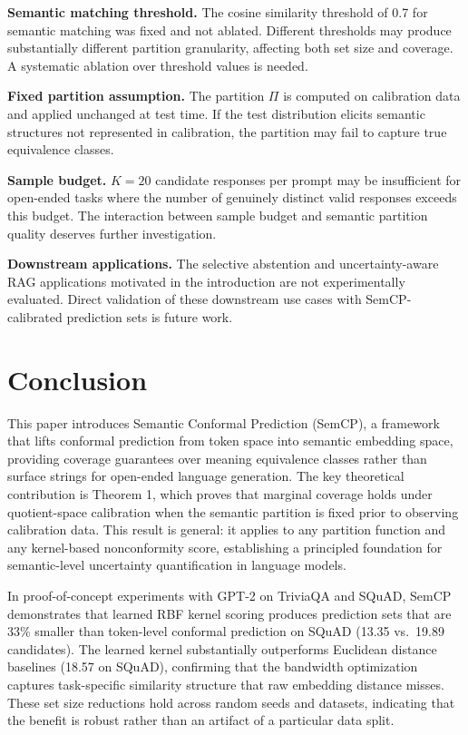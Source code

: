 \documentclass{article}
\begin{document}
\textbf{Semantic matching threshold.} The cosine similarity threshold of 0.7 for semantic matching was fixed and not ablated. Different thresholds may produce substantially different partition granularity, affecting both set size and coverage. A systematic ablation over threshold values is needed.

\textbf{Fixed partition assumption.} The partition $\Pi$ is computed on calibration data and applied unchanged at test time. If the test distribution elicits semantic structures not represented in calibration, the partition may fail to capture true equivalence classes.

\textbf{Sample budget.} $K = 20$ candidate responses per prompt may be insufficient for open-ended tasks where the number of genuinely distinct valid responses exceeds this budget. The interaction between sample budget and semantic partition quality deserves further investigation.

\textbf{Downstream applications.} The selective abstention and uncertainty-aware RAG applications motivated in the introduction are not experimentally evaluated. Direct validation of these downstream use cases with SemCP-calibrated prediction sets is future work.

\section{Conclusion}

\label{sec:conclusion}

This paper introduces Semantic Conformal Prediction (SemCP), a framework that lifts conformal prediction from token space into semantic embedding space, providing coverage guarantees over meaning equivalence classes rather than surface strings for open-ended language generation. The key theoretical contribution is Theorem 1, which proves that marginal coverage holds under quotient-space calibration when the semantic partition is fixed prior to observing calibration data. This result is general: it applies to any partition function and any kernel-based nonconformity score, establishing a principled foundation for semantic-level uncertainty quantification in language models.

In proof-of-concept experiments with GPT-2 on TriviaQA and SQuAD, SemCP demonstrates that learned RBF kernel scoring produces prediction sets that are 33\% smaller than token-level conformal prediction on SQuAD (13.35 vs.\ 19.89 candidates). The learned kernel substantially outperforms Euclidean distance baselines (18.57 on SQuAD), confirming that the bandwidth optimization captures task-specific similarity structure that raw embedding distance misses. These set size reductions hold across random seeds and datasets, indicating that the benefit is robust rather than an artifact of a particular data split.
\end{document}
